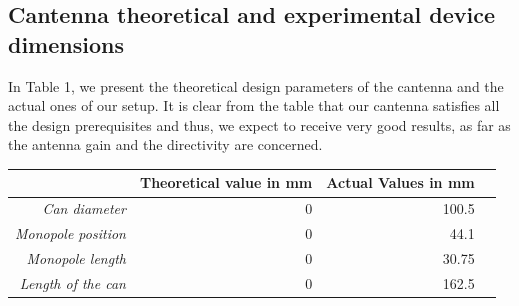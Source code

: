 \documentclass[12pt,a4paper]{article}
\begin{document}
\subsection{Cantenna theoretical and experimental device dimensions} 
In Table 1, we present the theoretical design parameters of the cantenna and the actual ones of our setup. It is clear from the table that our cantenna satisfies all the design prerequisites and thus, we expect to receive very good results, as far as the antenna gain and the directivity are concerned.

\begin{table}
	\begin{center}
		\begin{tabular}{r|r|r|r}\
		 & Theoretical value in mm& Actual Values in mm\\
		 \hline 
		 \emph{Can diameter} & 0 & 100.5\\
		 \emph{Monopole position} & 0 & 44.1 \\
		 \emph{Monopole length} & 0 & 30.75\\
		 \emph{Length of the can} & 0 & 162.5\\
		\end{tabular}
	\end{center}
\end{table}
\end{document}
